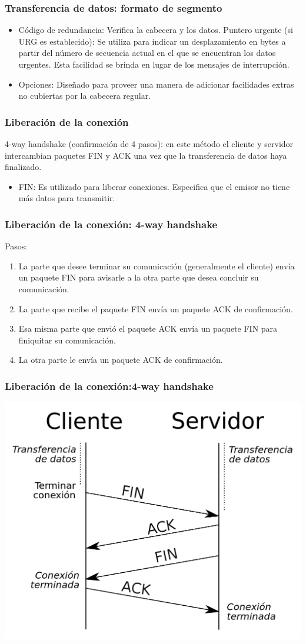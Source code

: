 \documentclass{beamer}
\begin{document}
\begin{frame}
\frametitle{Transferencia de datos: formato de segmento}
\begin{itemize}
\item Código de redundancia: Verifica la cabecera y los datos.
Puntero urgente (si URG es establecido): Se utiliza para indicar un desplazamiento en bytes a partir del número de secuencia actual en el que se encuentran los datos urgentes. Esta facilidad se brinda en lugar de los mensajes de interrupción.
\item Opciones: Diseñado para proveer una manera de adicionar facilidades extras no cubiertas por la cabecera regular.
\end{itemize}
\end{frame}

\begin{frame}
\frametitle{Liberación de la conexión}
4-way handshake (confirmación de 4 pasos): en este método el cliente y servidor intercambian paquetes FIN y ACK una vez que la transferencia de datos haya finalizado.
\vspace{5mm}
\begin{itemize}
\item FIN: Es utilizado para liberar conexiones. Especifica que el emisor no tiene más datos para transmitir. 
\end{itemize}
\end{frame}

\begin{frame}
\frametitle{Liberación de la conexión: 4-way handshake}
Pasos:
\vspace{5mm}
\begin{enumerate}
\item La parte que desee terminar su comunicación (generalmente el cliente) envía un paquete FIN para avisarle a la otra parte que desea concluir su comunicación.
\item La parte que recibe el paquete FIN envía un paquete ACK de confirmación.
\item Esa misma parte que envió el paquete ACK envía un paquete FIN para finiquitar su comunicación.
\item La otra parte le envía un paquete ACK de confirmación.
\end{enumerate}
\end{frame}

\begin{frame}
\frametitle{Liberación de la conexión:4-way handshake}
\includegraphics[scale=0.2]{4}\\
\end{frame}

 
\end{document}
